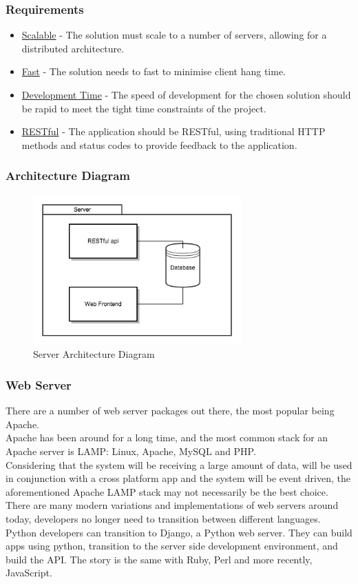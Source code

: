 \documentclass[draft,preprint,12pt,3p]{elsarticle}
\begin{document}
\subsubsection{Requirements}
\begin{itemize}
\item \underline{Scalable} - The solution must scale to a number of servers, allowing for a distributed architecture.
\item \underline{Fast} - The solution needs to fast to minimise client hang time.
\item \underline{Development Time} - The speed of development for the chosen solution should be rapid to meet the tight time constraints of the project.
\item \underline{RESTful} - The application should be RESTful, using traditional HTTP methods and status codes to provide feedback to the application.
\end{itemize}
\subsubsection{Architecture Diagram}
\begin{figure}[H]
    \centering
    \includegraphics[width=8cm]{diagrams/server}
    \caption {Server Architecture Diagram}
\end{figure}
\subsubsection{Web Server}
There are a number of web server packages out there, the most popular being Apache.\\
Apache has been around for a long time, and the most common stack for an Apache server is LAMP: Linux, Apache, MySQL and PHP.\\
Considering that the system will be receiving a large amount of data, will be used in conjunction with a cross platform app and the system will be event driven, the aforementioned Apache LAMP stack may not necessarily be the best choice.\\
There are many modern variations and implementations of web servers around today, developers no longer need to transition between different languages. Python developers can transition to Django, a Python web server. They can build apps using python, transition to the server side development environment, and build the API. The story is the same with Ruby, Perl and more recently, JavaScript.\\
\end{document}
